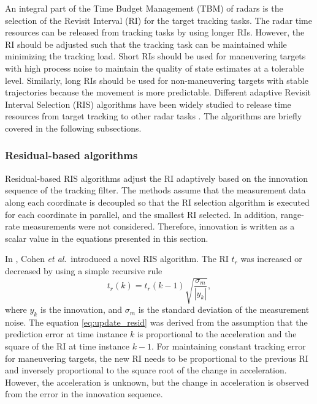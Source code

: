 \documentclass[english, 12pt, a4paper, elec, utf8, a-1b, online]{aaltothesis}
\newcommand{\etal}{\textit{et al}.~}
\newcommand{\ri}{t_r}
\begin{document}
An integral part of the Time Budget Management (TBM) of radars is the selection of the Revisit Interval (RI) for the target tracking tasks.
The radar time resources can be released from tracking tasks by using longer RIs. 
However, the RI should be adjusted such that the tracking task can be maintained while minimizing the tracking load.
Short RIs should be used for maneuvering targets with high process noise to maintain the quality of state estimates at a tolerable level. 
Similarly, long RIs should be used for non-maneuvering targets with stable trajectories because the movement is more predictable.
Different adaptive Revisit Interval Selection (RIS) algorithms have been widely studied to release time resources from target tracking to other radar tasks \cite{Cohen1986, Gardner1988, Munu1992, ChengTing2007, Baek2010, Watson1993, Charlish2015, Keuk1975, Shin1995, Benoudnine2006}.
The algorithms are briefly covered in the following subsections.

\subsubsection{Residual-based algorithms}

Residual-based RIS algorithms adjust the RI adaptively based on the innovation sequence of the tracking filter.
The methods assume that the measurement data along each coordinate is decoupled so that the RI selection algorithm is executed for each coordinate in parallel, and the smallest RI selected.
In addition, range-rate measurements were not considered.
Therefore, innovation is written as a scalar value in the equations presented in this section.

In \cite{Cohen1986}, Cohen \etal introduced a novel RIS algorithm.
The RI $\ri$ was increased or decreased by using a simple recursive rule 
\begin{equation}\label{eq:update_resid}
    \ri(k) = \ri(k-1)\sqrt{\frac{\sigma_m}{|y_k|}},
\end{equation}
where $y_k$ is the innovation, and $\sigma_m$ is the standard deviation of the measurement noise.
The equation \eqref{eq:update_resid} was derived from the assumption that the prediction error at time instance $k$ is proportional to the acceleration and the square of the RI at time instance $k-1$.
For maintaining constant tracking error for maneuvering targets, the new RI needs to be proportional to the previous RI and inversely proportional to the square root of the change in acceleration.
However, the acceleration is unknown, but the change in acceleration is observed from the error in the innovation sequence.
\end{document}
